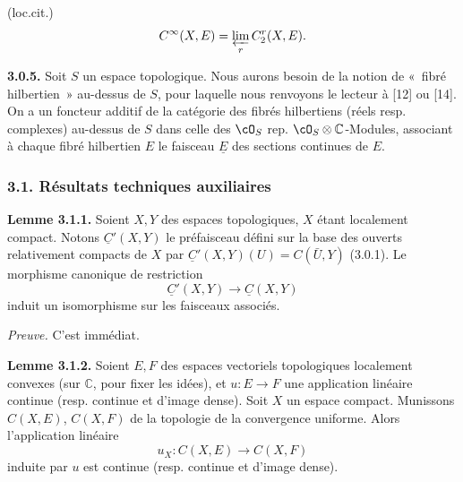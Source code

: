 (loc.cit.)
\[
  C^\infty(X,E)=\varprojlim_r C^r_2(X,E).
\]

\textbf{3.0.5.}
Soit $S$ un espace topologique. Nous aurons besoin de la notion de «~fibré hilbertien~» au-dessus de $S$, pour laquelle nous renvoyons le lecteur à [12] ou [14]. On a un foncteur additif de la catégorie des fibrés hilbertiens (réels resp. complexes) au-dessus de $S$ dans celle des $\cO_S$ rep. $\cO_S\otimes\mathbb C$-Modules, associant à chaque fibré hilbertien $E$ le faisceau $\underline E$ des sections continues de $E$.

\subsubsection*{3.1. Résultats techniques auxiliaires}
\textbf{Lemme 3.1.1.} Soient $X,Y$ des espaces topologiques, $X$ étant localement compact. Notons $\underline C'(X,Y)$ le préfaisceau défini sur la base des ouverts relativement compacts de $X$ par $\underline C'(X,Y)(U)=C(\bar U,Y)$ (3.0.1). Le morphisme canonique de restriction
\[
  \underline C'(X,Y)\longrightarrow \underline C(X,Y)
\]
induit un isomorphisme sur les faisceaux associés.

\emph{Preuve.} C'est immédiat.

\textbf{Lemme 3.1.2.} Soient $E,F$ des espaces vectoriels topologiques localement convexes (sur $\mathbb C$, pour fixer les idées), et $u:E\to F$ une application linéaire continue (resp. continue et d'image dense). Soit $X$ un espace compact. Munissons $C(X,E)$, $C(X,F)$ de la topologie de la convergence uniforme. Alors l'application linéaire
\[
  u_X:C(X,E)\longrightarrow C(X,F)
\]
induite par $u$ est continue (resp. continue et d'image dense).

